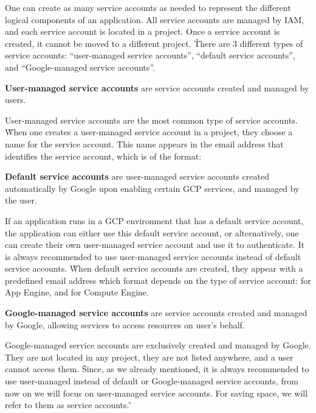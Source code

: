 One can create as many service accounts as needed to represent the different logical components of an application. All
service accounts are managed by IAM, and each service account is located in a project. Once a service account is
created, it cannot be moved to a different project. \v

There are 3 different types of service accounts: ``user-managed service accounts'', ``default service accounts'', and
``Google-managed service accounts''.

\textbf{User-managed service accounts} are service accounts created and managed by users.
\ed

User-managed service accounts are the most common type of service accounts. \v

When one creates a user-managed service account in a project, they choose a name for the service account. This name
appears in the email address that identifies the service account, which is of the format:

\textbf{Default service accounts} are user-managed service accounts created automatically by Google upon enabling
certain GCP services, and managed by the user.
\ed

If an application runs in a GCP environment that has a default service account, the application can either use this
default service account, or alternatively, one can create their own user-managed service account and use it to
authenticate. It is always recommended to use user-managed service accounts instead of default service accounts. \v

When default service accounts are created, they appear with a predefined email address which format depends on the
type of service account:  for App Engine, and
 for Compute Engine.

\textbf{Google-managed service accounts} are service accounts created and managed by Google, allowing services to
access resources on user's behalf.
\ed

Google-managed service accounts are exclusively created and managed by Google. They are not located in any project,
they are not listed anywhere, and a user cannot access them. \v

Since, as we already mentioned, it is always recommended to use user-managed instead of default or Google-managed
service accounts, from now on we will focus on user-managed service accounts. For saving space, we will refer to them
as service accounts. \v

